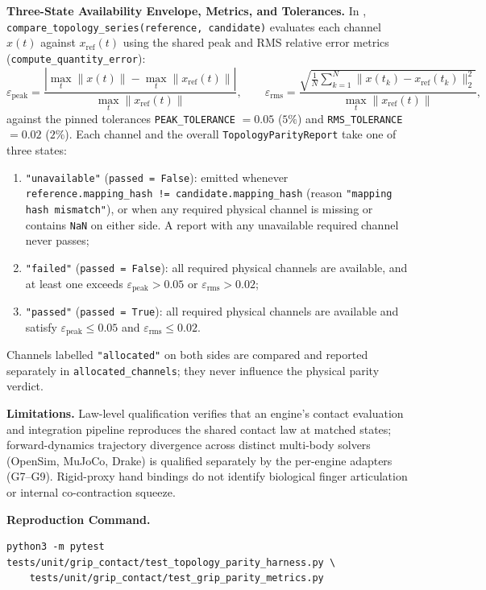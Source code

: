 \documentclass[11pt,a4paper]{article}
\begin{document}
\textbf{Three-State Availability Envelope, Metrics, and Tolerances.}
In , \texttt{compare\_topology\_series(reference, candidate)} evaluates each channel $x(t)$ against $x_{\mathrm{ref}}(t)$ using the shared peak and RMS relative error metrics (\texttt{compute\_quantity\_error}):
\begin{equation}
\varepsilon_{\mathrm{peak}} = \frac{\left|\max_t \|x(t)\| - \max_t \|x_{\mathrm{ref}}(t)\|\right|}{\max_t \|x_{\mathrm{ref}}(t)\|}, \qquad
\varepsilon_{\mathrm{rms}} = \frac{\sqrt{\frac{1}{N}\sum_{k=1}^{N} \|x(t_k) - x_{\mathrm{ref}}(t_k)\|_2^2}}{\max_t \|x_{\mathrm{ref}}(t)\|},
\end{equation}
against the pinned tolerances \texttt{PEAK\_TOLERANCE} $= 0.05$ ($5\%$) and \texttt{RMS\_TOLERANCE} $= 0.02$ ($2\%$). Each channel and the overall \texttt{TopologyParityReport} take one of three states:
\begin{enumerate}[leftmargin=*,noitemsep]
\item \texttt{"unavailable"} (\texttt{passed = False}): emitted whenever \texttt{reference.mapping\_hash != candidate.mapping\_hash} (reason \texttt{"mapping hash mismatch"}), or when any required physical channel is missing or contains \texttt{NaN} on either side. A report with any unavailable required channel never passes;
\item \texttt{"failed"} (\texttt{passed = False}): all required physical channels are available, and at least one exceeds $\varepsilon_{\mathrm{peak}} > 0.05$ or $\varepsilon_{\mathrm{rms}} > 0.02$;
\item \texttt{"passed"} (\texttt{passed = True}): all required physical channels are available and satisfy $\varepsilon_{\mathrm{peak}} \le 0.05$ and $\varepsilon_{\mathrm{rms}} \le 0.02$.
\end{enumerate}
Channels labelled \texttt{"allocated"} on both sides are compared and reported separately in \texttt{allocated\_channels}; they never influence the physical parity verdict.

\textbf{Limitations.}
Law-level qualification verifies that an engine's contact evaluation and integration pipeline reproduces the shared contact law at matched states; forward-dynamics trajectory divergence across distinct multi-body solvers (OpenSim, MuJoCo, Drake) is qualified separately by the per-engine adapters (G7--G9). Rigid-proxy hand bindings do not identify biological finger articulation or internal co-contraction squeeze.

\textbf{Reproduction Command.}
\begin{verbatim}
python3 -m pytest tests/unit/grip_contact/test_topology_parity_harness.py \
    tests/unit/grip_contact/test_grip_parity_metrics.py
\end{verbatim}
\end{document}

